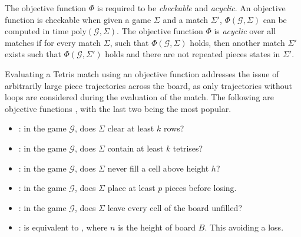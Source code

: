 The objective function $\Phi$ is required to be \emph{checkable} and \emph{acyclic}. An objective function is checkable when given a game $\Sigma$ and a match $\Sigma'$, $\Phi(\mathcal{G},\Sigma)$ can be computed in time $\text{poly}(\mathcal{G},\Sigma)$. The objective function $\Phi$ is \emph{acyclic} over all matches if for every match $\Sigma$, such that $\Phi(\mathcal{G}, \Sigma)$ holds, then another match $\Sigma'$ exists such that  $\Phi(\mathcal{G},\Sigma')$ holds and there are not repeated pieces states in $\Sigma'$.

Evaluating a Tetris match using an objective function addresses the issue of arbitrarily large piece trajectories across the board, as only trajectories without loops are considered during the evaluation of the match. The following are objective functions \cite{TIH, as}, with the last two being the most popular.


\begin{itemize}
  \item {}: in the game $\mathcal{G}$, does $\Sigma$ clear at least $k$ rows?
  \item {}: in the game $\mathcal{G}$, does $\Sigma$ contain at least $k$ tetrises?
  \item {}: in the game $\mathcal{G}$, does $\Sigma$ never fill a cell above height $h$?
  \item {}: in the game $\mathcal{G}$, does $\Sigma$ place at least $p$ pieces before losing.
  \item \clearing: in the game $\mathcal{G}$, does $\Sigma$ leave every cell of the board unfilled?
  \item \survival: is equivalent to , where $n$ is the height of board $B$. This avoiding a loss.
\end{itemize}



